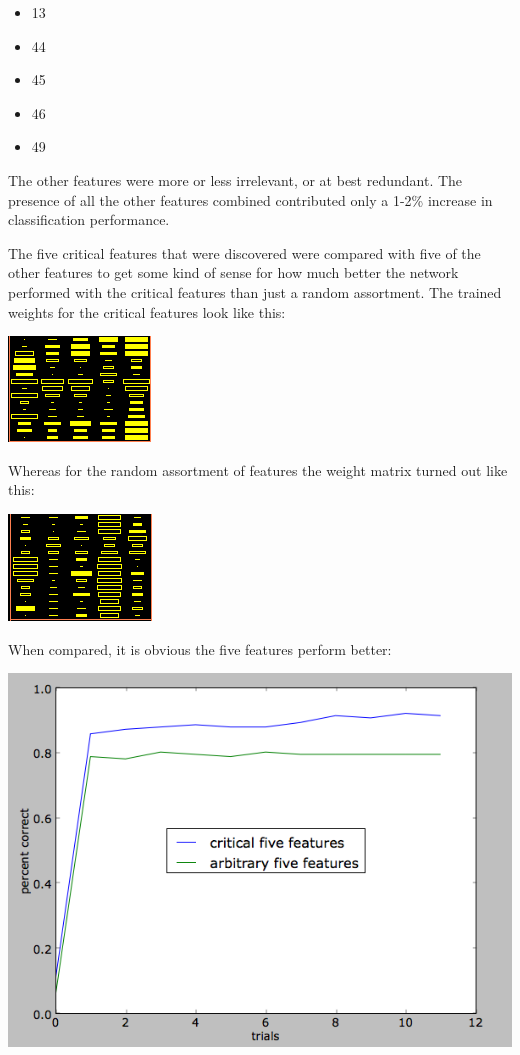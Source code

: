 \documentclass[12pt]{article}
\begin{document}
\begin{itemize}
\item 13
\item 44
\item 45
\item 46
\item 49
\end{itemize}

The other features were more or less irrelevant, or at best redundant.  The presence of all the other features combined contributed only a 1-2\% increase in classification performance.

The five critical features that were discovered were compared with five of the other features to get some kind of sense for how much better the network performed with the critical features than just a random assortment.  The trained weights for the critical features look like this:

\begin{center}
\includegraphics[scale=1.2]{5featuresweights.png}
\end{center}

Whereas for the random assortment of features the weight matrix turned out like this:

\begin{center}
\includegraphics[scale=1.2]{5controlweights.png}
\end{center}

When compared, it is obvious the five features perform better:

\begin{center}
\includegraphics[scale=0.7]{5features.png}
\end{center}
\end{document}
